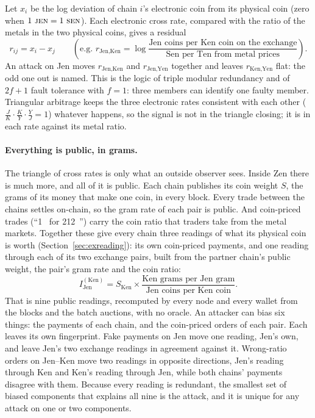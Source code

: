 Let $x_i$ be the log deviation of chain $i$'s electronic coin from its physical coin (zero when $1~\textsc{jen}=1~\textsc{sen}$). Each electronic cross rate, compared with the ratio of the metals in the two physical coins, gives a residual
\begin{equation}
r_{ij} = x_i - x_j \qquad (\text{e.g. } r_{\text{Jen,Ken}} = \log\frac{\text{Jen coins per Ken coin on the exchange}}{\text{Sen per Ten from metal prices}}).
\end{equation}
An attack on Jen moves $r_{\text{Jen,Ken}}$ and $r_{\text{Jen,Yen}}$ together and leaves $r_{\text{Ken,Yen}}$ flat: the odd one out is named. This is the logic of triple modular redundancy and of $2f+1$ fault tolerance with $f=1$: three members can identify one faulty member. Triangular arbitrage keeps the three electronic rates consistent with each other ($\tfrac{J}{K}\cdot\tfrac{K}{Y}\cdot\tfrac{Y}{J}=1$) whatever happens, so the signal is not in the triangle closing; it is in each rate against its metal ratio.

\paragraph{Everything is public, in grams.} The triangle of cross rates is only what an outside observer sees. Inside Zen there is much more, and all of it is public. Each chain publishes its coin weight $S$, the grams of its money that make one coin, in every block. Every trade between the chains settles on-chain, so the gram rate of each pair is public. And coin-priced trades (``1~\KEN{} for 212~\JEN'') carry the coin ratio that traders take from the metal markets. Together these give every chain three readings of what its physical coin is worth (Section~\ref{sec:exreading}): its own coin-priced payments, and one reading through each of its two exchange pairs, built from the partner chain's public weight, the pair's gram rate and the coin ratio:
\begin{equation}
I_{\text{Jen}}^{(\text{Ken})} = S_{\text{Ken}}\times\frac{\text{Ken grams per Jen gram}}{\text{Jen coins per Ken coin}} .
\end{equation}
That is nine public readings, recomputed by every node and every wallet from the blocks and the batch auctions, with no oracle. An attacker can bias six things: the payments of each chain, and the coin-priced orders of each pair. Each leaves its own fingerprint. Fake payments on Jen move one reading, Jen's own, and leave Jen's two exchange readings in agreement against it. Wrong-ratio orders on Jen--Ken move two readings in opposite directions, Jen's reading through Ken and Ken's reading through Jen, while both chains' payments disagree with them. Because every reading is redundant, the smallest set of biased components that explains all nine is the attack, and it is unique for any attack on one or two components.

